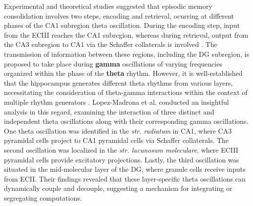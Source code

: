 \documentclass[../main.tex]{subfiles}
\begin{document}
Experimental and theoretical studies suggested that episodic memory consolidation involves two steps, encoding and retrieval, ocurring at different phases of the CA1 subregion theta oscillation.
During the encoding step, input from the ECIII reaches the CA1 subregion, whereas during retrieval, output from the CA3 subregion to CA1 via the Schaffer collaterals is involved \citep{judge_theta_2004,ketz_theta_2013}.
The transmission of information between these regions, including the DG subregion, is proposed to take place during \textbf{gamma} oscillations of varying frequencies organized within the phase of the \textbf{theta} rhythm.
However, it is well-established that the hippocampus generates different theta rhythms from various layers, necessitating the consideration of theta-gamma interactions within the context of multiple rhythm generators \citep{buzsaki_theta_2002,lopez-madrona_different_2020}.
Lopez-Madrona et al. \citep{lopez-madrona_different_2020} conducted an insightful analysis in this regard, examining the interaction of three distinct and independent theta oscillations along with their corresponding gamma oscillations.
One theta oscillation was identified in the \textit{str. radiatum} in CA1, where CA3 pyramidal cells project to CA1 pyramidal cells via Schaffer collaterals.
The second oscillation was localized in the \textit{str. lacunosum moleculare}, where ECIII pyramidal cells provide excitatory projections.
Lastly, the third oscillation was situated in the mid-molecular layer of the DG, where granule cells receive inputs from ECII.
Their findings revealed that these layer-specific theta oscillations can dynamically couple and decouple, suggesting a mechanism for integrating or segregating computations.
\end{document}
